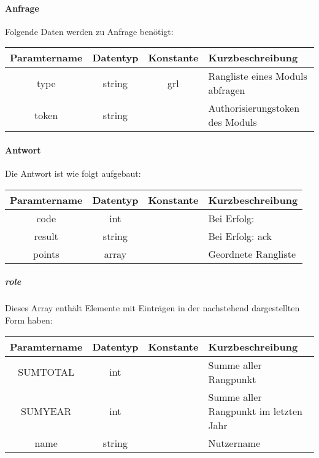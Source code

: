 \paragraph{Anfrage}Folgende Daten werden zu Anfrage benötigt:
\begin{table}[H]
	\begin{tabular}{|c|c|c|p{6.5cm}|}
		\hline
		\textbf{Paramtername} & \textbf{Datentyp} & \textbf{Konstante} & \textbf{Kurzbeschreibung}                                                                                               \\ \hline
		type                & string            & grl                & Rangliste eines Moduls abfragen \\ \hline
		token               & string            &                    & Authorisierungstoken des Moduls \\ \hline
	\end{tabular}
\end{table}
\paragraph{Antwort}Die Antwort ist wie folgt aufgebaut:
\begin{table}[H]
	\begin{tabular}{|c|c|c|p{6.5cm}|}
		\hline
		\textbf{Paramtername} & \textbf{Datentyp} & \textbf{Konstante} & \textbf{Kurzbeschreibung}            \\ \hline                
		code                & int              &                 & Bei Erfolg: {\glqq 0\grqq} \\ \hline
		result              & string           &                 & Bei Erfolg: {\glqq ack\grqq} \\ \hline
		points              & array            &                 & Geordnete Rangliste \\ \hline
	\end{tabular}
\end{table}
\subparagraph{role}Dieses Array enthält Elemente mit Einträgen in der nachstehend dargestellten Form haben:
\begin{table}[H]
	\begin{tabular}{|c|c|c|p{6.5cm}|}
		\hline
		\textbf{Paramtername} & \textbf{Datentyp} & \textbf{Konstante} & \textbf{Kurzbeschreibung}    \\ \hline
		SUMTOTAL           & int               &                 & Summe aller Rangpunkt \\ \hline
		SUMYEAR            & int               &                 & Summe aller Rangpunkt im letzten Jahr \\ \hline
		name               & string            &                 & Nutzername \\ \hline
	\end{tabular}
\end{table}
